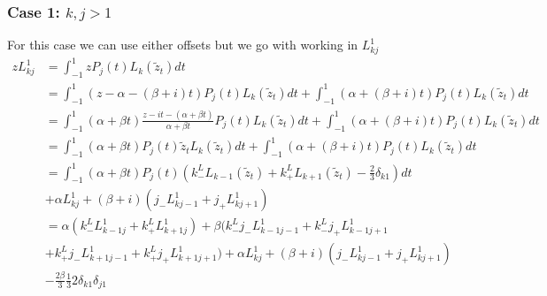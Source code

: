 \documentclass{article}
\begin{document}
\subsubsection{Case 1: $k,j>1$}
For this case we can use either offsets but we go with working in $L_{kj}^1$
\begin{align}
    zL_{kj}^1 &= \int_{-1}^1zP_j(t)L_k(\tilde{z}_t)dt\\
    &= \int_{-1}^1(z-\alpha-(\beta+i)t)P_j(t)L_k(\tilde{z}_t)dt
    +\int_{-1}^1(\alpha+(\beta+i)t)P_j(t)L_k(\tilde{z}_t)dt\\
    &= \int_{-1}^1(\alpha+\beta t)\frac{z-it-(\alpha+\beta t)}{\alpha+\beta t}P_j(t)L_k(\tilde{z}_t)dt
    +\int_{-1}^1(\alpha+(\beta+i)t)P_j(t)L_k(\tilde{z}_t)dt\\
    &= \int_{-1}^1(\alpha+\beta t)P_j(t)\tilde{z}_tL_k(\tilde{z}_t)dt
    +\int_{-1}^1(\alpha+(\beta+i)t)P_j(t)L_k(\tilde{z}_t)dt\\
    &= \int_{-1}^1(\alpha+\beta t)P_j(t)(k_-^LL_{k-1}(\tilde{z}_t)+k_+^LL_{k+1}(\tilde{z}_t)-\frac{2}{3}\delta_{k1})dt\\
    &+\alpha L_{kj}^1+(\beta+i)(j_-L_{kj-1}^1+j_+L_{kj+1}^1)\\
    &=\alpha(k_-^LL_{k-1j}^1+k_+^LL_{k+1j}^1)+
    \beta(k_-^Lj_-L_{k-1j-1}^1+k_-^Lj_+L_{k-1j+1}^1\\
    &+k_+^Lj_-L_{k+1j-1}^1+k_+^Lj_+L_{k+1j+1}^1)+\alpha L_{kj}^1+(\beta+i)(j_-L_{kj-1}^1+j_+L_{kj+1}^1)\\
    &-\frac{2\beta}{3}\frac{1}{3}2\delta_{k1}\delta_{j1}
\end{align}
\end{document}
